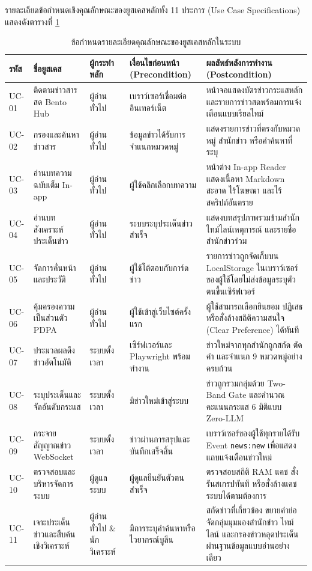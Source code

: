 รายละเอียดข้อกำหนดเชิงคุณลักษณะของยูสเคสหลักทั้ง 11 ประการ (Use Case Specifications) แสดงดังตารางที่ \ref{tab:use_case_specs}

\begin{table}[H]
\centering
\small
\caption{ข้อกำหนดรายละเอียดคุณลักษณะของยูสเคสหลักในระบบ}
\label{tab:use_case_specs}
\begin{tabular}{|>{\centering\arraybackslash}p{1.2cm}|p{2.8cm}|p{2.0cm}|p{3.2cm}|p{4.8cm}|}
\hline
\textbf{รหัส} & \textbf{ชื่อยูสเคส} & \textbf{ผู้กระทำหลัก} & \textbf{เงื่อนไขก่อนหน้า (Precondition)} & \textbf{ผลลัพธ์หลังการทำงาน (Postcondition)} \\
\hline
UC-01 & ติดตามข่าวสารสด Bento Hub & ผู้อ่านทั่วไป & เบราว์เซอร์เชื่อมต่ออินเทอร์เน็ต & หน้าจอแสดงบัตรข่าวกระแสหลักและรายการข่าวสดพร้อมการแจ้งเตือนแบบเรียลไทม์ \\ \hline
UC-02 & กรองและค้นหาข่าวสาร & ผู้อ่านทั่วไป & ข้อมูลข่าวได้รับการจำแนกหมวดหมู่ & แสดงรายการข่าวที่ตรงกับหมวดหมู่ สำนักข่าว หรือคำค้นหาที่ระบุ \\ \hline
UC-03 & อ่านบทความฉบับเต็ม In-app & ผู้อ่านทั่วไป & ผู้ใช้คลิกเลือกบทความ & หน้าต่าง In-app Reader แสดงเนื้อหา Markdown สะอาด ไร้โฆษณา และไร้สคริปต์อันตราย \\ \hline
UC-04 & อ่านบทสังเคราะห์ประเด็นข่าว & ผู้อ่านทั่วไป & ระบบระบุประเด็นข่าวสำเร็จ & แสดงบทสรุปภาพรวมข้ามสำนัก ไทม์ไลน์เหตุการณ์ และรายชื่อสำนักข่าวร่วม \\ \hline
UC-05 & จัดการคั่นหน้าและประวัติ & ผู้อ่านทั่วไป & ผู้ใช้โต้ตอบกับการ์ดข่าว & รายการข่าวถูกจัดเก็บบน LocalStorage ในเบราว์เซอร์ของผู้ใช้โดยไม่ส่งข้อมูลระบุตัวตนขึ้นเซิร์ฟเวอร์ \\ \hline
UC-06 & คุ้มครองความเป็นส่วนตัว PDPA & ผู้อ่านทั่วไป & ผู้ใช้เข้าสู่เว็บไซต์ครั้งแรก & ผู้ใช้สามารถเลือกยินยอม ปฏิเสธ หรือสั่งล้างสถิติความสนใจ (Clear Preference) ได้ทันที \\ \hline
UC-07 & ประมวลผลดึงข่าวอัตโนมัติ & ระบบตั้งเวลา & เซิร์ฟเวอร์และ Playwright พร้อมทำงาน & ข่าวใหม่จากทุกสำนักถูกสกัด ตัดคำ และจำแนก 9 หมวดหมู่อย่างครบถ้วน \\ \hline
UC-08 & ระบุประเด็นและจัดอันดับกระแส & ระบบตั้งเวลา & มีข่าวใหม่เข้าสู่ระบบ & ข่าวถูกรวมกลุ่มด้วย Two-Band Gate และคำนวณคะแนนกระแส 6 มิติแบบ Zero-LLM \\ \hline
UC-09 & กระจายสัญญาณข่าว WebSocket & ระบบตั้งเวลา & ข่าวผ่านการสรุปและบันทึกเสร็จสิ้น & เบราว์เซอร์ของผู้ใช้ทุกรายได้รับ Event \texttt{news:new} เพื่อแสดงแถบแจ้งเตือนข่าวใหม่ \\ \hline
UC-10 & ตรวจสอบและบริหารจัดการระบบ & ผู้ดูแลระบบ & ผู้ดูแลยืนยันตัวตนสำเร็จ & ตรวจสอบสถิติ RAM แคช สั่งรันสเกรปทันที หรือสั่งล้างแคชระบบได้ตามต้องการ \\ \hline
UC-11 & เจาะประเด็นข่าวและสืบค้นเชิงวิเคราะห์ & ผู้อ่านทั่วไป \& นักวิเคราะห์ & มีการระบุคำค้นหาหรือไวยากรณ์บูลีน & สกัดข่าวที่เกี่ยวข้อง ขยายคำย่อ จัดกลุ่มมุมมองสำนักข่าว ไทม์ไลน์ และกรองข่าวหลุดประเด็นผ่านฐานข้อมูลแบบอ่านอย่างเดียว \\
\hline
\end{tabular}
\end{table}

